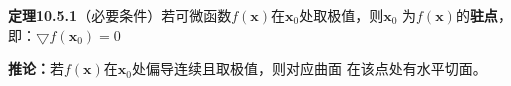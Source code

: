 \begin{center}
\end{center}

{\bf 定理10.5.1}（必要条件）若可微函数$f(\bm{x})$在$\bm{x}_0$处取极值，则$\bm{x}_0$
为$f(\bm{x})$的{\bf 驻点}，即：$\bigtriangledown f(\bm{x}_0)=0$

{\bf 推论：}若$f(\bm{x})$在$\bm{x}_0$处偏导连续且取极值，则对应曲面
在该点处有水平切面。

